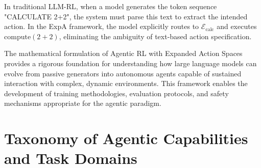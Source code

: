 In traditional LLM-RL, when a model generates the token sequence "CALCULATE 2+2", the system must parse this text to extract the intended action. In the ExpA framework, the model explicitly routes to $\mathcal{E}_{\text{calc}}$ and executes $\text{compute}(2+2)$, eliminating the ambiguity of text-based action specification.

The mathematical formulation of Agentic RL with Expanded Action Spaces provides a rigorous foundation for understanding how large language models can evolve from passive generators into autonomous agents capable of sustained interaction with complex, dynamic environments. This framework enables the development of training methodologies, evaluation protocols, and safety mechanisms appropriate for the agentic paradigm.

\section{Taxonomy of Agentic Capabilities and Task Domains}

